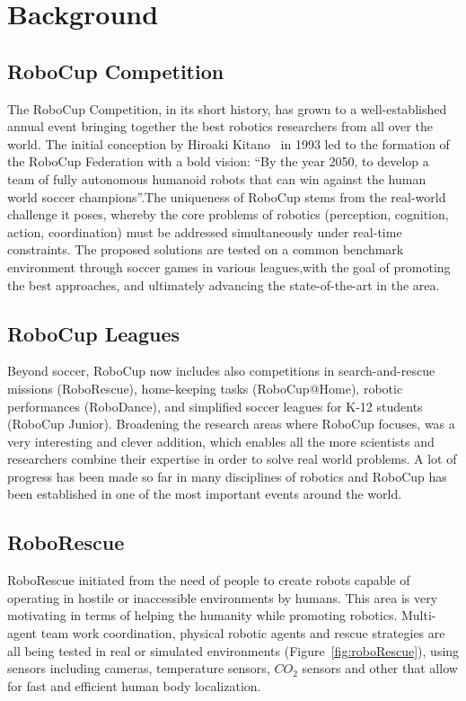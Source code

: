 \chapter{Background}
\label{background}

\section{RoboCup Competition}

The RoboCup Competition, in its short history, has grown to a well-established annual event bringing together the best robotics researchers from all over the world. The initial conception by Hiroaki Kitano~\cite{robocup} in 1993 led to the formation of the RoboCup Federation with a bold vision: ``By the year 2050, to develop a team of fully autonomous humanoid robots that can win against the human world soccer champions''.The uniqueness of RoboCup stems from the real-world challenge it poses, whereby the core problems of robotics (perception, cognition, action, coordination) must be addressed simultaneously under real-time constraints. The proposed solutions are tested on a common benchmark environment through soccer games in various leagues,with the goal of promoting the best approaches, and ultimately advancing the state-of-the-art in the area. 

\section{RoboCup Leagues}

Beyond soccer, RoboCup now includes also competitions in search-and-rescue missions (RoboRescue), home-keeping tasks (RoboCup@Home), robotic performances (RoboDance), and simplified soccer leagues for K-12 students (RoboCup Junior). Broadening the research areas where RoboCup focuses, was a very interesting and clever addition, which enables all the more scientists and researchers combine their expertise in order to solve real world problems. A lot of progress has been made so far in many disciplines of robotics and RoboCup has been established in one of the most important events around the world.

\section{RoboRescue}

RoboRescue initiated from the need of people to create robots capable of operating in hostile or inaccessible environments by humans. This area is very motivating in terms of helping the humanity while promoting robotics. Multi-agent team work coordination, physical robotic agents and rescue strategies are all being tested in real or simulated environments (Figure~\ref{fig:roboRescue}), using sensors including cameras, temperature sensors, $CO_2$ sensors and other that allow for fast and efficient human body localization.

